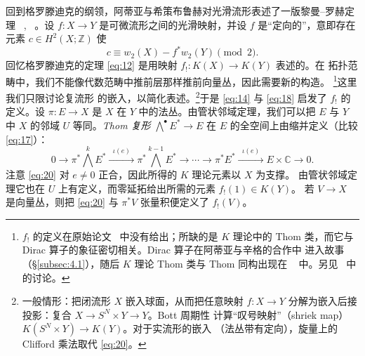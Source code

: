 \documentclass[11pt]{amsart}
\theoremstyle{definition}
\theoremstyle{remark}
\theoremstyle{plain}
\numberwithin{equation}{section}
\renewcommand{\:}{\colon}
\newcommand{\CC}{{\mathbb C}}
\newcommand{\ZZ}{{\mathbb Z}}
\DeclareMathOperator{\ch}{ch}
\DeclareMathOperator{\Todd}{Todd}
\begin{document}
回到格罗滕迪克的纲领，阿蒂亚与希策布鲁赫对光滑流形表述了一版黎曼–罗赫定理
~\cite{AH2}, ~\cite{H2}。设 $f\:X\to Y$ 是可微流形之间的光滑映射，并设 $f$
是“定向的”，意即存在元素 $c\in H^2(X;\ZZ)$ 使
  \begin{equation}\label{eq:19}
     c\equiv w_2(X) - f^*w_2(Y) \pmod2.
  \end{equation}
回忆格罗滕迪克的定理 \eqref{eq:12} 是用映射 $f_!\:K(X)\to K(Y)$ 表述的。在
拓扑范畴中，我们不能像代数范畴中推前层那样推前向量丛，因此需要新的构造。
\footnote{$f_!$ 的定义在原始论文~\cite{AH2} 中没有给出；所缺的是 $K$ 理论中的
Thom 类，而它与 Dirac 算子的象征密切相关。Dirac 算子在阿蒂亚与辛格的合作中
进入故事（\S\ref{subsec:4.1}），随后 $K$ 理论 Thom 类与 Thom 同构出现在
~\cite[\S12]{ABS} 中。另见~\cite[\S1]{Seg4} 中的讨论。}这里我们只限讨论复流形
的嵌入，以简化表述。\footnote{一般情形：把闭流形 $X$ 嵌入球面，从而把任意映射
$f\:X \to Y$ 分解为嵌入后接投影：复合 $X \to S^N\times Y \to Y$。Bott 周期性
计算“叹号映射”（shriek map）$K(S^N\times Y) \to K(Y)$。对于实流形的嵌入
（法丛带有定向），旋量上的 Clifford 乘法取代 \eqref{eq:20}。}于是
\eqref{eq:14} 与 \eqref{eq:18} 启发了 $f_!$ 的定义。设 $\pi \:E \to X$ 是
$X$ 在 $Y$ 中的法丛。由管状邻域定理，我们可以把 $E$ 与 $Y$ 中 $X$ 的邻域
$U$ 等同。{\it Thom 复形} ${\textstyle\bigwedge} ^{\bullet }E^*\to E$ 在 $E$
的全空间上由缩并定义（比较 \eqref{eq:17}）：
  \begin{equation}\label{eq:20}
     0 \longrightarrow \pi ^*{\textstyle\bigwedge} ^kE^*
     \xrightarrow{\;\;\iota (e)\;\;} \pi 
     ^*{\textstyle\bigwedge} ^{k-1}E^* \longrightarrow \cdots \longrightarrow
     \pi ^*E^* \xrightarrow{\;\;\iota (e)\;\;} E\times \CC \longrightarrow 0.
  \end{equation}
注意 \eqref{eq:20} 对 $e\not= 0$ 正合，因此所得的 $K$ 理论元素以 $X$ 为支撑。
由管状邻域定理它也在 $U$ 上有定义，而零延拓给出所需的元素 $f_!(1) \in K(Y)$。
若 $V \to X$ 是向量丛，则把 \eqref{eq:20} 与 $\pi ^*V$ 张量积便定义了
$f_!(V)$。


\end{document}
